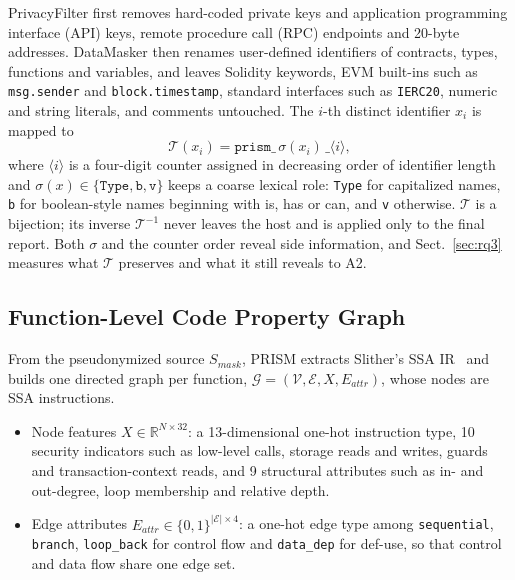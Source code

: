 \documentclass[runningheads]{llncs}
\makeatletter
\renewcommand\paragraph{\@startsection{paragraph}{4}{\parindent}{\z@}{-0.5em}{\normalfont\itshape}}
\makeatother
\begin{document}
\paragraph{Mechanism.} PrivacyFilter first removes hard-coded private keys and application programming interface (API) keys, remote procedure call (RPC) endpoints and 20-byte addresses. DataMasker then renames user-defined identifiers of contracts, types, functions and variables, and leaves Solidity keywords, EVM built-ins such as \texttt{msg.sender} and \texttt{block.timestamp}, standard interfaces such as \texttt{IERC20}, numeric and string literals, and comments untouched. The $i$-th distinct identifier $x_i$ is mapped to
\begin{equation}
\mathcal{T}(x_i) = \texttt{prism\_}\,\sigma(x_i)\,\texttt{\_}\langle i\rangle,
\end{equation}
where $\langle i\rangle$ is a four-digit counter assigned in decreasing order of identifier length and $\sigma(x)\in\{\texttt{Type},\texttt{b},\texttt{v}\}$ keeps a coarse lexical role: \texttt{Type} for capitalized names, \texttt{b} for boolean-style names beginning with is, has or can, and \texttt{v} otherwise. $\mathcal{T}$ is a bijection; its inverse $\mathcal{T}^{-1}$ never leaves the host and is applied only to the final report. Both $\sigma$ and the counter order reveal side information, and Sect.~\ref{sec:rq3} measures what $\mathcal{T}$ preserves and what it still reveals to A2.

\subsection{Function-Level Code Property Graph}

From the pseudonymized source $S_{\mathit{mask}}$, PRISM extracts Slither's SSA IR~\cite{feist2019slither} and builds one directed graph per function, $\mathcal{G}=(\mathcal{V},\mathcal{E},X,E_{\mathit{attr}})$, whose nodes are SSA instructions.
\begin{itemize}
\item Node features $X\in\mathbb{R}^{N\times 32}$: a 13-dimensional one-hot instruction type, 10 security indicators such as low-level calls, storage reads and writes, guards and transaction-context reads, and 9 structural attributes such as in- and out-degree, loop membership and relative depth.
\item Edge attributes $E_{\mathit{attr}}\in\{0,1\}^{|\mathcal{E}|\times 4}$: a one-hot edge type among \texttt{sequential}, \texttt{branch}, \texttt{loop\_back} for control flow and \texttt{data\_dep} for def-use, so that control and data flow share one edge set.
\end{itemize}
\end{document}
